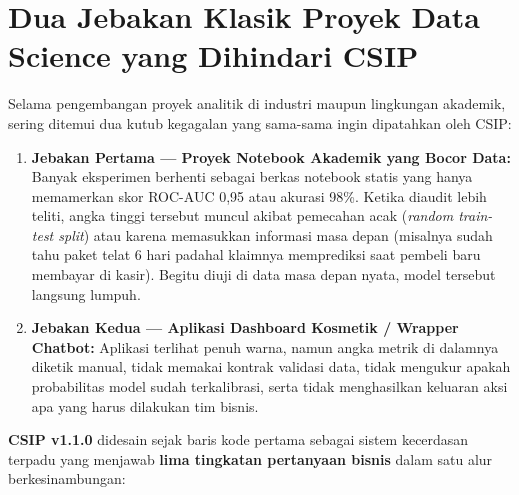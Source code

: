 \documentclass[11pt,a4paper,oneside]{book}
\begin{document}
\section{Dua Jebakan Klasik Proyek Data Science yang Dihindari CSIP}

Selama pengembangan proyek analitik di industri maupun lingkungan akademik, sering ditemui dua kutub kegagalan yang sama-sama ingin dipatahkan oleh CSIP:

\begin{enumerate}
  \item \textbf{Jebakan Pertama --- Proyek Notebook Akademik yang Bocor Data:} Banyak eksperimen berhenti sebagai berkas notebook statis yang hanya memamerkan skor ROC-AUC 0,95 atau akurasi 98\%. Ketika diaudit lebih teliti, angka tinggi tersebut muncul akibat pemecahan acak (\emph{random train-test split}) atau karena memasukkan informasi masa depan (misalnya sudah tahu paket telat 6 hari padahal klaimnya memprediksi saat pembeli baru membayar di kasir). Begitu diuji di data masa depan nyata, model tersebut langsung lumpuh.
  \item \textbf{Jebakan Kedua --- Aplikasi Dashboard Kosmetik / Wrapper Chatbot:} Aplikasi terlihat penuh warna, namun angka metrik di dalamnya diketik manual, tidak memakai kontrak validasi data, tidak mengukur apakah probabilitas model sudah terkalibrasi, serta tidak menghasilkan keluaran aksi apa yang harus dilakukan tim bisnis.
\end{enumerate}

\textbf{CSIP v1.1.0} didesain sejak baris kode pertama sebagai sistem kecerdasan terpadu yang menjawab \textbf{lima tingkatan pertanyaan bisnis} dalam satu alur berkesinambungan:
\end{document}
